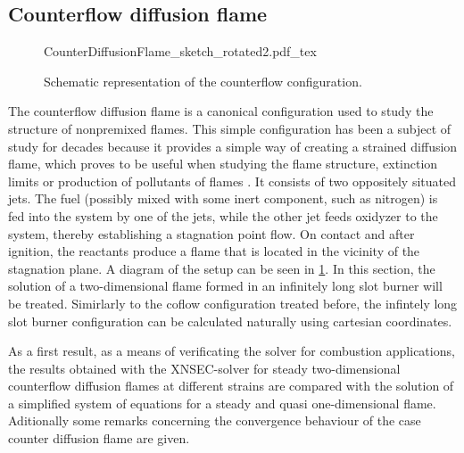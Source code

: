 
\subsection{Counterflow diffusion flame}\label{ss:CDF}
\begin{figure}[b]
	\begin{center}
		\def\svgwidth{0.8\textwidth}
		{CounterDiffusionFlame_sketch_rotated2.pdf_tex}
		\caption{Schematic representation of the counterflow configuration.}
		\label{fig:CDFScheme}
	\end{center}
\end{figure}
The counterflow diffusion flame is a canonical configuration used to study the structure of nonpremixed flames. This simple configuration has been a subject of study for decades because it provides a simple way of creating a strained diffusion flame, which proves to be useful when studying the flame structure, extinction limits or production of pollutants of flames \citep{pandyaStructureFlatCounterFlow1964,spaldingTheoryMixingChemical1961,keyesFlameSheetStarting1987}. It consists of two oppositely situated jets. The fuel (possibly mixed with some inert component, such as nitrogen) is fed into the system by one of the jets, while the other jet feeds oxidyzer to the system, thereby establishing a stagnation point flow. On contact and after ignition, the reactants produce a flame that is located in the vicinity of the stagnation plane. A diagram of the setup can be seen in \cref{fig:CDFScheme}. In this section, the solution of a two-dimensional flame formed in an infinitely long slot burner will be treated. Simirlarly to the coflow configuration treated before, the infintely long slot burner configuration can be calculated naturally using cartesian coordinates.

As a first result, as a means of verificating the solver for combustion applications, the results obtained with the XNSEC-solver for steady two-dimensional counterflow diffusion flames at different strains are compared with the solution of a simplified system of equations for a steady and quasi one-dimensional flame. Aditionally some remarks concerning the convergence behaviour of the case counter diffusion flame are given. 


